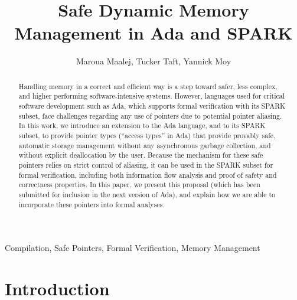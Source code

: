 \documentclass[runningheads]{llncs}
\begin{document}

\title{Safe Dynamic Memory Management in Ada and SPARK}
\author{Maroua Maalej\Envelope{}, Tucker Taft, Yannick Moy}

\maketitle
\begin{abstract}
Handling memory in a correct and efficient way is a step toward safer, less complex, and higher performing software-intensive systems. However, languages used for critical software development such as Ada, which supports formal verification with its SPARK subset, face challenges regarding any use of pointers due to potential pointer aliasing. In this work, we introduce an extension to the Ada language, and to its SPARK subset, to provide pointer types (``access types'' in Ada) that provide provably safe, automatic storage management without any asynchronous garbage collection, and without explicit deallocation by the user. Because the mechanism for these safe pointers relies on strict control of aliasing, it can be used in the SPARK subset for formal verification, including both information flow analysis and proof of safety and correctness properties. In this paper, we present this proposal (which has been submitted for inclusion in the next version of Ada), and explain
how we are able to incorporate these pointers into formal analyses.
\end{abstract}



\keywords

Compilation, Safe Pointers, Formal Verification, Memory Management


\section{Introduction}
\end{document}
